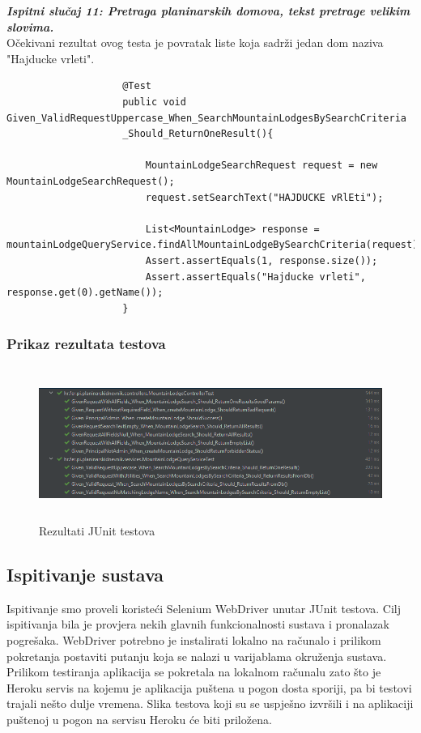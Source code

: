 					\textbf{\textit{Ispitni slučaj 11: Pretraga planinarskih domova, tekst pretrage velikim slovima.}}\\
					Očekivani rezultat ovog testa je povratak liste koja sadrži jedan dom naziva "Hajducke vrleti".\\
							
				
				\begin{lstlisting}
					@Test
					public void Given_ValidRequestUppercase_When_SearchMountainLodgesBySearchCriteria
					_Should_ReturnOneResult(){
						
						MountainLodgeSearchRequest request = new MountainLodgeSearchRequest();
						request.setSearchText("HAJDUCKE vRlEti");
						
						List<MountainLodge> response = mountainLodgeQueryService.findAllMountainLodgeBySearchCriteria(request);
						Assert.assertEquals(1, response.size());
						Assert.assertEquals("Hajducke vrleti", response.get(0).getName());
					}
				\end{lstlisting}
				
				\subsubsection{Prikaz rezultata testova}
				
				\begin{figure}[H]
					\includegraphics[scale=0.6, height=50mm, width=150mm]{slike/junit.png} %
					\centering
					\caption{Rezultati JUnit testova}
					\label{fig:junit testovi}
				\end{figure}
				
				\eject 
			
			
			\subsection{Ispitivanje sustava}
			
			  Ispitivanje smo proveli koristeći Selenium WebDriver unutar JUnit testova. Cilj ispitivanja bila je provjera nekih glavnih funkcionalnosti sustava i pronalazak pogrešaka. WebDriver potrebno je instalirati lokalno na računalo i prilikom pokretanja postaviti putanju koja se nalazi u varijablama okruženja sustava. Prilikom testiranja aplikacija se pokretala na lokalnom računalu zato što je Heroku servis na kojemu je aplikacija puštena u pogon dosta sporiji, pa bi testovi trajali nešto dulje vremena.
			  Slika testova koji su se uspješno izvršili i na aplikaciji puštenoj u pogon na servisu Heroku će biti priložena.\\
	
